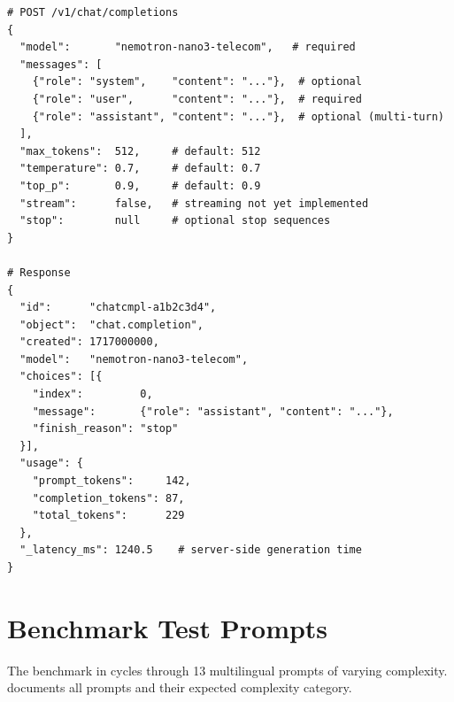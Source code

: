 \begin{lstlisting}[style=Python,
  caption={Chat completion request schema
           (\texttt{inference/serve.py})},
  label={lst:request-schema}]
# POST /v1/chat/completions
{
  "model":       "nemotron-nano3-telecom",   # required
  "messages": [
    {"role": "system",    "content": "..."},  # optional
    {"role": "user",      "content": "..."},  # required
    {"role": "assistant", "content": "..."},  # optional (multi-turn)
  ],
  "max_tokens":  512,     # default: 512
  "temperature": 0.7,     # default: 0.7
  "top_p":       0.9,     # default: 0.9
  "stream":      false,   # streaming not yet implemented
  "stop":        null     # optional stop sequences
}

# Response
{
  "id":      "chatcmpl-a1b2c3d4",
  "object":  "chat.completion",
  "created": 1717000000,
  "model":   "nemotron-nano3-telecom",
  "choices": [{
    "index":         0,
    "message":       {"role": "assistant", "content": "..."},
    "finish_reason": "stop"
  }],
  "usage": {
    "prompt_tokens":     142,
    "completion_tokens": 87,
    "total_tokens":      229
  },
  "_latency_ms": 1240.5    # server-side generation time
}
\end{lstlisting}

\section{Benchmark Test Prompts}
\label{app:benchmark-prompts}

The benchmark in  cycles through
13 multilingual prompts of varying complexity. 
documents all prompts and their expected complexity category.


